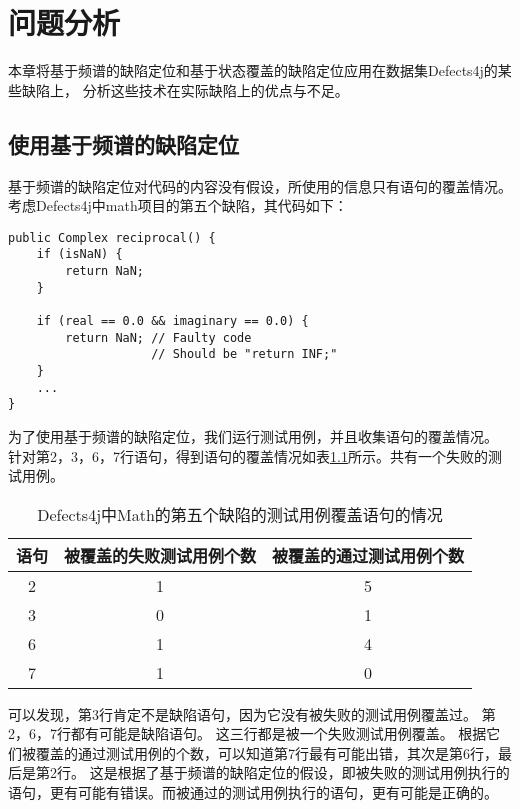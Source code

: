 \chapter{问题分析}

本章将基于频谱的缺陷定位和基于状态覆盖的缺陷定位应用在数据集Defects4j的某些缺陷上，
分析这些技术在实际缺陷上的优点与不足。

\section{使用基于频谱的缺陷定位}

基于频谱的缺陷定位对代码的内容没有假设，所使用的信息只有语句的覆盖情况。
考虑Defects4j中math项目的第五个缺陷，其代码如下：
\lstset{language=Java}
\begin{lstlisting}
public Complex reciprocal() {
    if (isNaN) {
        return NaN;
    }

    if (real == 0.0 && imaginary == 0.0) {
        return NaN; // Faulty code
                    // Should be "return INF;"
    }
    ...
}
\end{lstlisting}

为了使用基于频谱的缺陷定位，我们运行测试用例，并且收集语句的覆盖情况。
针对第2，3，6，7行语句，得到语句的覆盖情况如表\ref{math_5_statecover}所示。共有一个失败的测试用例。

\begin{table}
\centering
\begin{tabular}{|c|c|c|}
\hline
语句 & 被覆盖的失败测试用例个数 & 被覆盖的通过测试用例个数 \\
\hline
2 & 1 & 5 \\
3 & 0 & 1 \\
6 & 1 & 4 \\
7 & 1 & 0 \\
\hline
\end{tabular}
\caption{Defects4j中Math的第五个缺陷的测试用例覆盖语句的情况}
\label{math_5_statecover}
\end{table}

可以发现，第3行肯定不是缺陷语句，因为它没有被失败的测试用例覆盖过。
第2，6，7行都有可能是缺陷语句。
这三行都是被一个失败测试用例覆盖。
根据它们被覆盖的通过测试用例的个数，可以知道第7行最有可能出错，其次是第6行，最后是第2行。
这是根据了基于频谱的缺陷定位的假设，即被失败的测试用例执行的语句，更有可能有错误。而被通过的测试用例执行的语句，更有可能是正确的。

